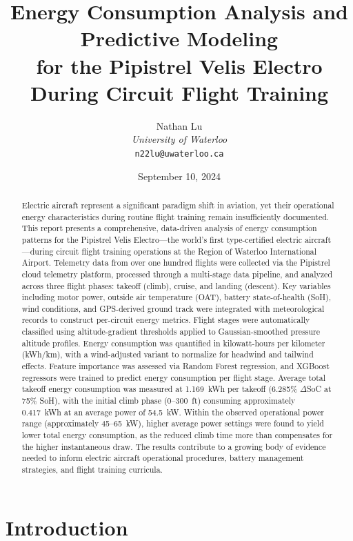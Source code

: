 \documentclass[11pt,a4paper]{article}
\title{\textbf{Energy Consumption Analysis and Predictive Modeling\\for the Pipistrel Velis Electro During Circuit Flight Training}}
\author{
    Nathan Lu\\
    \textit{University of Waterloo}\\
    \texttt{n22lu@uwaterloo.ca}
}
\date{September 10, 2024}
\begin{document}
\maketitle

\begin{abstract}
Electric aircraft represent a significant paradigm shift in aviation, yet their operational energy characteristics during routine flight training remain insufficiently documented.
This report presents a comprehensive, data-driven analysis of energy consumption patterns for the Pipistrel Velis Electro---the world's first type-certified electric aircraft---during circuit flight training operations at the Region of Waterloo International Airport.
Telemetry data from over one hundred flights were collected via the Pipistrel cloud telemetry platform, processed through a multi-stage data pipeline, and analyzed across three flight phases: takeoff (climb), cruise, and landing (descent).
Key variables including motor power, outside air temperature (OAT), battery state-of-health (SoH), wind conditions, and GPS-derived ground track were integrated with meteorological records to construct per-circuit energy metrics.
Flight stages were automatically classified using altitude-gradient thresholds applied to Gaussian-smoothed pressure altitude profiles.
Energy consumption was quantified in kilowatt-hours per kilometer (kWh/km), with a wind-adjusted variant to normalize for headwind and tailwind effects.
Feature importance was assessed via Random Forest regression, and XGBoost regressors were trained to predict energy consumption per flight stage.
Average total takeoff energy consumption was measured at 1.169~kWh per takeoff (6.285\% $\Delta$SoC at 75\% SoH), with the initial climb phase (0--300~ft) consuming approximately 0.417~kWh at an average power of 54.5~kW.
Within the observed operational power range (approximately 45--65~kW), higher average power settings were found to yield lower total energy consumption, as the reduced climb time more than compensates for the higher instantaneous draw.
The results contribute to a growing body of evidence needed to inform electric aircraft operational procedures, battery management strategies, and flight training curricula.
\end{abstract}

\section{Introduction}
\end{document}
